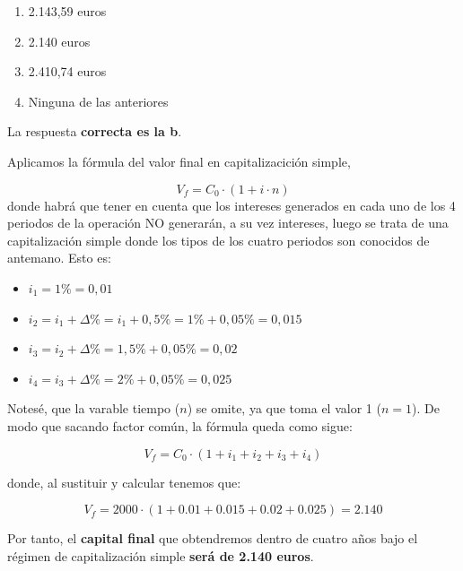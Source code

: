 \documentclass[
  letterpaper,
  DIV=11,
  numbers=noendperiod]{scrreprt}
\begin{document}
\begin{enumerate}
\def\labelenumi{\alph{enumi})}
\item
  2.143,59 euros
\item
  2.140 euros
\item
  2.410,74 euros
\item
  Ninguna de las anteriores
\end{enumerate}

\begin{tcolorbox}[enhanced jigsaw, left=2mm, opacityback=0, colback=white, breakable, arc=.35mm, bottomrule=.15mm, rightrule=.15mm, toprule=.15mm, leftrule=.75mm, colframe=quarto-callout-tip-color-frame]
\begin{minipage}[t]{5.5mm}
\textcolor{quarto-callout-tip-color}{\faLightbulb}
\end{minipage}%
\begin{minipage}[t]{\textwidth - 5.5mm}

La respuesta \textbf{correcta es la b}.

Aplicamos la fórmula del valor final en capitalizacición simple,

\[V_f=C_0\cdot(1+i\cdot n)\] donde habrá que tener en cuenta que los
intereses generados en cada uno de los 4 periodos de la operación NO
generarán, a su vez intereses, luego se trata de una capitalización
simple donde los tipos de los cuatro periodos son conocidos de antemano.
Esto es:

\begin{itemize}
\item
  \(i_1=1\%=0,01\)
\item
  \(i_2=i_1+\Delta \%=i_1+0,5\%=1\%+0,05\%=0,015\)
\item
  \(i_3=i_2+\Delta \%=1,5\%+0,05\%=0,02\)
\item
  \(i_4=i_3+\Delta \%=2\%+0,05\%=0,025\)
\end{itemize}

Notesé, que la varable tiempo (\(n\)) se omite, ya que toma el valor 1
(\(n=1\)). De modo que sacando factor común, la fórmula queda como
sigue:

\[V_f=C_0\cdot(1+i_1+i_2+i_3+i_4)\]

donde, al sustituir y calcular tenemos que:

\[V_f=2000\cdot\left(1+0.01+0.015+0.02+0.025\right)=2.140\]

Por tanto, el \textbf{capital final} que obtendremos dentro de cuatro
años bajo el régimen de capitalización simple \textbf{será de 2.140
euros}.

\end{minipage}%
\end{tcolorbox}
\end{document}
